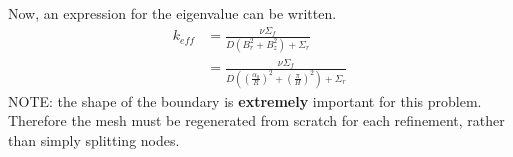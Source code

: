   Now, an expression for the eigenvalue can be written.
  \begin{align}
    k_{eff} &= \frac{\nu \Sigma_f}{D(B_r^2 + B_z^2) + \Sigma_r} \\
    &= \frac{\nu \Sigma_f}{D\left(\left(\frac{\alpha_0}{R}\right)^2 + 
      \left(\frac{\pi}{H}\right)^2 \right) + \Sigma_r}
  \end{align}
  NOTE: the shape of the boundary is \textbf{extremely} important for this 
  problem. Therefore
  the mesh must be regenerated from scratch for each 
  refinement, rather than simply splitting nodes.
  
